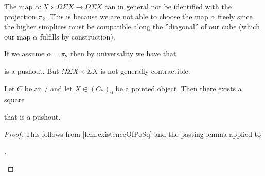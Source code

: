 \begin{remark}\label{rmk:mapNotProj}
    The map $\alpha\colon X\times\Omega\Sigma X\to\Omega\Sigma X$ can in general not be identified with the projection $\pi_2$.
    This is because we are not able to choose the map $\alpha$ freely since the higher simplices must be compatible along the ''diagonal'' of our cube (which our map $\alpha$ fulfills by construction).

    If we assume $\alpha=\pi_2$ then by universality we have that 
    \begin{center}
    \end{center}
    is a pushout.
    But $\Omega\Sigma X\times \Sigma X$ is not generally contractible. 
\end{remark}
\begin{corollary}\label{lem:poOfProductIsSuspension}
    Let $C$ be an \inftytop/ and let $X\in \left(C_*\right)_0$ be a pointed object. 
    Then there exists a square
    \begin{center}
    \end{center}
    that is a pushout.
    \begin{proof}
        This follows from \cref{lem:existenceOfPoSq} and the pasting lemma applied to 
        \begin{center}
            \;.
        \end{center}
    \end{proof}
\end{corollary}
